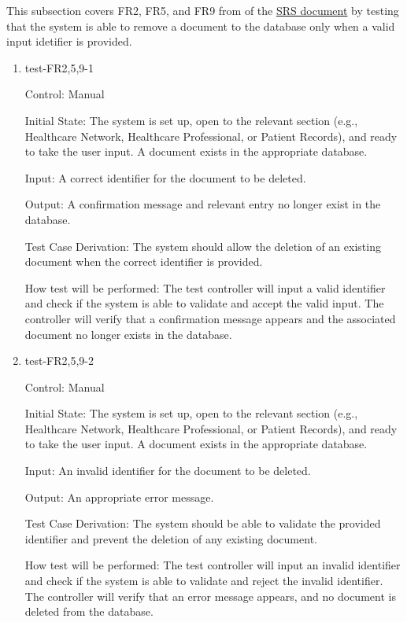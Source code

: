 \documentclass[12pt, titlepage]{article}
\begin{document}
This subsection covers FR2, FR5, and FR9 from of the \href{https://github.com/Inreet-Kaur/capstone/blob/main/docs/SRS/SRS.pdf}{SRS document} by testing that the system is able to remove a document to the database only when a valid input idetifier is provided.

\begin{enumerate}

\item{test-FR2,5,9-1} \label{test-FR2,5,9-1}

Control: Manual

Initial State: The system is set up, open to the relevant section (e.g., Healthcare Network, Healthcare Professional, or Patient Records), and ready to take the user input. A document exists in the appropriate database.

Input: A correct identifier for the document to be deleted.

Output: A confirmation message and relevant entry no longer exist in the database.

Test Case Derivation: The system should allow the deletion of an existing document when the correct identifier is provided. 

How test will be performed: The test controller will input a valid identifier and check if the system is able to validate and accept the valid input. The controller will verify that a confirmation message appears and the associated document no longer exists in the database.

					
\item{test-FR2,5,9-2} \label{test-FR2,5,9-2}

Control: Manual

Initial State: The system is set up, open to the relevant section (e.g., Healthcare Network, Healthcare Professional, or Patient Records), and ready to take the user input. A document exists in the appropriate database.

Input: An invalid identifier for the document to be deleted.

Output: An appropriate error message.

Test Case Derivation: The system should be able to validate the provided identifier and prevent the deletion of any existing document. 

How test will be performed: The test controller will input an invalid identifier and check if the system is able to validate and reject the invalid identifier. The controller will verify that an error message appears, and no document is deleted from the database.

\end{enumerate}
\end{document}
